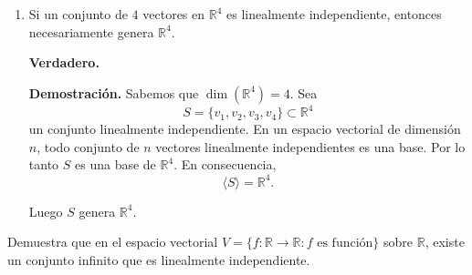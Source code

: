 \documentclass[12pt,a4paper]{article}
\begin{document}
\begin{solucion}
\begin{enumerate}
        \item[(d)] Si un conjunto de $4$ vectores en $\mathbb{R}^{4}$ es
        linealmente independiente, entonces necesariamente genera
        $\mathbb{R}^{4}$.

        \textbf{Verdadero.}

        \textbf{Demostración.}  
        Sabemos que $\dim(\mathbb{R}^{4})=4$. Sea
        \[
        S=\{v_{1},v_{2},v_{3},v_{4}\}\subset\mathbb{R}^{4}
        \]
        un conjunto linealmente independiente. En un espacio vectorial de dimensión $n$, todo conjunto de $n$ vectores
        linealmente independientes es una base. Por lo tanto $S$ es una base de
        $\mathbb{R}^{4}$. En consecuencia,
        \[
        \langle S\rangle=\mathbb{R}^{4}.
        \]

        Luego $S$ genera $\mathbb{R}^{4}$.

        \end{enumerate}
    \end{solucion}

    \begin{mdframed}[style=mdbluebox,frametitle={Ejercicio 3}]
        Demuestra que en el espacio vectorial $V=\{f:\mathbb{R}\to\mathbb{R}:f\text{ es función}\}$
        sobre $\mathbb{R}$, existe un conjunto infinito que es linealmente independiente.
    \end{mdframed}
\end{document}
